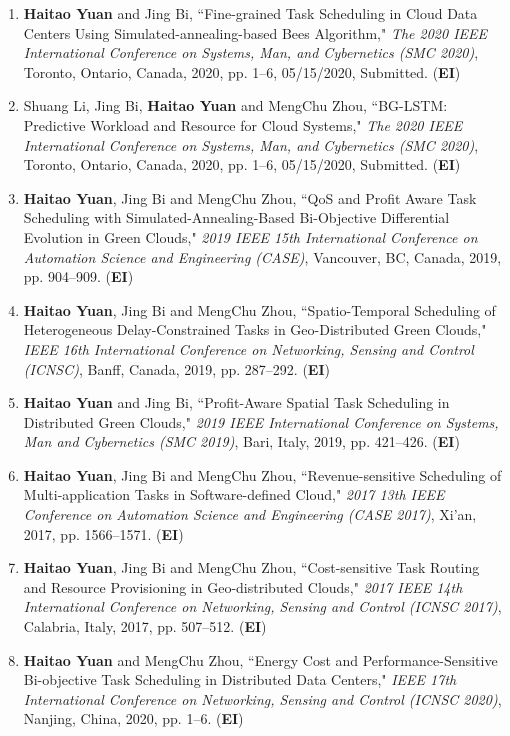 \documentclass[margin,line]{res}
\begin{document}
\begin{resume}
\begin{enumerate}
\item \textbf{Haitao Yuan} and Jing Bi, ``Fine-grained Task Scheduling in Cloud Data Centers Using Simulated-annealing-based Bees Algorithm," \emph{The 2020 IEEE International Conference on Systems, Man, and Cybernetics (SMC 2020)}, Toronto, Ontario, Canada, 2020, pp. 1--6, 05/15/2020, Submitted. (\textbf{EI})
\item Shuang Li, Jing Bi, \textbf{Haitao Yuan} and MengChu Zhou, ``BG-LSTM: Predictive Workload and Resource for Cloud Systems," \emph{The 2020 IEEE International Conference on Systems, Man, and Cybernetics (SMC 2020)}, Toronto, Ontario, Canada, 2020, pp. 1--6, 05/15/2020, Submitted. (\textbf{EI})
\item \textbf{Haitao Yuan}, Jing Bi and MengChu Zhou, ``QoS and Profit Aware Task Scheduling with Simulated-Annealing-Based Bi-Objective Differential Evolution in Green Clouds," \emph{2019 IEEE 15th International Conference on Automation Science and Engineering (CASE)}, Vancouver, BC, Canada, 2019, pp. 904--909. (\textbf{EI})
\item \textbf{Haitao Yuan}, Jing Bi and MengChu Zhou, ``Spatio-Temporal Scheduling of Heterogeneous Delay-Constrained Tasks in Geo-Distributed Green Clouds," \emph{IEEE 16th International Conference on Networking, Sensing and Control (ICNSC)}, Banff, Canada, 2019, pp. 287--292. (\textbf{EI})
\item \textbf{Haitao Yuan} and Jing Bi, ``Profit-Aware Spatial Task Scheduling in Distributed Green Clouds," \emph{2019 IEEE International Conference on Systems, Man and Cybernetics (SMC 2019)}, Bari, Italy, 2019, pp. 421--426. (\textbf{EI})
\item \textbf{Haitao Yuan}, Jing Bi and MengChu Zhou, ``Revenue-sensitive Scheduling of Multi-application Tasks in Software-defined Cloud," \emph{2017 13th IEEE Conference on Automation Science and Engineering (CASE 2017)}, Xi'an, 2017, pp. 1566--1571. (\textbf{EI})
\item \textbf{Haitao Yuan}, Jing Bi and MengChu Zhou, ``Cost-sensitive Task Routing and Resource Provisioning in Geo-distributed Clouds," \emph{2017 IEEE 14th International Conference on Networking, Sensing and Control (ICNSC 2017)}, Calabria, Italy, 2017, pp. 507--512. (\textbf{EI})
\item \textbf{Haitao Yuan} and MengChu Zhou, ``Energy Cost and Performance-Sensitive Bi-objective Task Scheduling in Distributed Data Centers," \emph{IEEE 17th International Conference on Networking, Sensing and Control (ICNSC 2020)}, Nanjing, China, 2020, pp. 1--6. (\textbf{EI})

\end{enumerate}
\end{resume}
\end{document}

